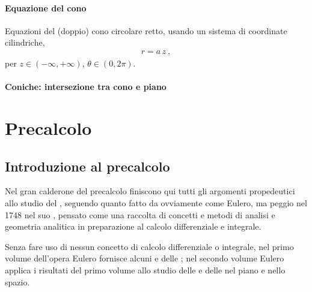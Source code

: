 \documentclass[letterpaper,10pt,italian]{jupyterBook}
\begin{document}
\subsection{Equazione del cono}
\label{\detokenize{ch/analytic_geometry/analytic_geometry_3d/cone:equazione-del-cono}}
\sphinxAtStartPar
Equazioni del (doppio) cono circolare retto, usando un sistema di coordinate cilindriche,
\begin{equation*}
\begin{split}r = a \, z \ ,\end{split}
\end{equation*}
\sphinxAtStartPar
per \(z \in (-\infty, +\infty)\), \(\theta \in (0, 2 \pi)\).


\subsection{Coniche: intersezione tra cono e piano}
\label{\detokenize{ch/analytic_geometry/analytic_geometry_3d/cone:coniche-intersezione-tra-cono-e-piano}}\label{\detokenize{ch/analytic_geometry/analytic_geometry_3d/cone:geometry-analytic-3d-cone-conics}}
\sphinxstepscope


\part{Precalcolo}

\sphinxstepscope




\chapter{Introduzione al pre\sphinxhyphen{}calcolo}
\label{\detokenize{ch/precalculus:introduzione-al-pre-calcolo}}\label{\detokenize{ch/precalculus:math-hs-precalculus}}\label{\detokenize{ch/precalculus::doc}}
\sphinxAtStartPar
Nel gran calderone del pre\sphinxhyphen{}calcolo finiscono qui tutti gli argomenti propedeutici allo studio del {\hyperref[\detokenize{ch/calculus:math-hs-calculus}]{}}, seguendo quanto fatto da  \sphinxhyphen{} ovviamente come Eulero, ma peggio \sphinxhyphen{} nel 1748 nel suo , pensato come una raccolta di concetti e metodi di analisi e geometria analitica in preparazione al calcolo differenziale e integrale.

\sphinxAtStartPar
Senza fare uso di nessun concetto di calcolo differenziale o integrale, nel primo volume dell’opera Eulero fornisce alcuni  e delle ; nel secondo volume Eulero applica i risultati del primo volume allo studio delle  e delle  nel piano e nello spazio.
\end{document}
